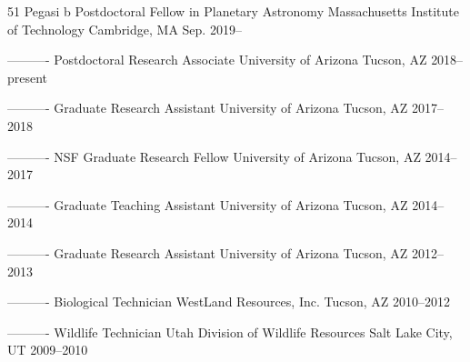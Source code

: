 

\begin{cventries}

  \cventry
    {51 Pegasi b Postdoctoral Fellow in Planetary Astronomy} %
    {Massachusetts Institute of Technology} %
    {Cambridge, MA} %
    {Sep. 2019--} %
    {}
    
----------
  \cventry
    {Postdoctoral Research Associate} %
    {University of Arizona} %
    {Tucson, AZ} %
    {2018--present} %
    {}

----------
  \cventry
    {Graduate Research Assistant} %
    {University of Arizona} %
    {Tucson, AZ} %
    {2017--2018} %
    {}

----------
  \cventry
    {NSF Graduate Research Fellow} %
    {University of Arizona} %
    {Tucson, AZ} %
    {2014--2017} %
    {}

----------
  \cventry
    {Graduate Teaching Assistant} %
    {University of Arizona} %
    {Tucson, AZ} %
    {2014--2014} %
    {}

----------
  \cventry
    {Graduate Research Assistant} %
    {University of Arizona} %
    {Tucson, AZ} %
    {2012--2013} %
    {}

----------
  \cventry
    {Biological Technician} %
    {WestLand Resources, Inc.} %
    {Tucson, AZ} %
    {2010--2012} %
    {}

----------
  \cventry
    {Wildlife Technician} %
    {Utah Division of Wildlife Resources} %
    {Salt Lake City, UT} %
    {2009--2010} %
    {}



\end{cventries}